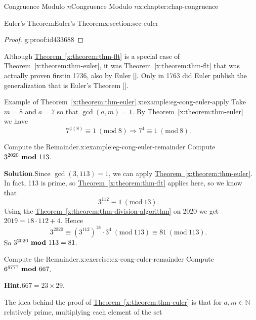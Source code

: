 \documentclass[oneside,10pt,]{book}
\newcommand{\blocktitlefont}{\relax}
\newcommand{\xreffont}{\relax}
\numberwithin{equation}{section}
\newcommand{\Mod}[1]{\ \left(\mathrm{mod}\ #1\right)}
\newcommand{\mmod}[1]{\ \mathrm{\bf mod}\ #1}
\begin{document}
\begin{chapterptx}{Congruence Modulo \(n\)}{}{Congruence Modulo \(n\)}{}{}{x:chapter:chap-congruence}
\begin{sectionptx}{Euler's Theorem}{}{Euler's Theorem}{}{}{x:section:sec-euler}
\begin{proof}{}{g:proof:id433688}
\end{proof}
Although \hyperref[x:theorem:thm-flt]{Theorem~{\xreffont\ref{x:theorem:thm-flt}}} is a special case of \hyperref[x:theorem:thm-euler]{Theorem~{\xreffont\ref{x:theorem:thm-euler}}}, it was \hyperref[x:theorem:thm-flt]{Theorem~{\xreffont\ref{x:theorem:thm-flt}}} that was actually proven first\textemdash{}in 1736, also by Euler \hyperlink{x:biblio:bib-euler-54}{[{\xreffont 1}]}. Only in 1763 did Euler publish the generalization that is Euler's Theorem \hyperlink{x:biblio:bib-euler-271}{[{\xreffont 2}]}.%
\begin{example}{Example of Theorem~{\xreffont\ref*{x:theorem:thm-euler}}.}{x:example:eg-cong-euler-apply}%
Take \(m = 8\) and \(a = 7\) so that \(\gcd(a,m) = 1\). By \hyperref[x:theorem:thm-euler]{Theorem~{\xreffont\ref{x:theorem:thm-euler}}} we have%
\begin{equation*}
7^{\phi(8)} \equiv 1 \Mod{8} \Rightarrow 7^4 \equiv 1 \Mod{8}\text{.}
\end{equation*}
%
\end{example}
\begin{example}{Compute the Remainder.}{x:example:eg-cong-euler-remainder}%
Compute \(3^{2020} \mmod 113\).%
\par\smallskip%
\noindent\textbf{\blocktitlefont Solution}.\hypertarget{g:solution:id235946}{}\quad{}Since \(\gcd(3,113) = 1\), we can apply \hyperref[x:theorem:thm-euler]{Theorem~{\xreffont\ref{x:theorem:thm-euler}}}. In fact, 113 is prime, so \hyperref[x:theorem:thm-flt]{Theorem~{\xreffont\ref{x:theorem:thm-flt}}} applies here, so we know that%
\begin{equation*}
3^{112} \equiv 1 \Mod{13}\text{.}
\end{equation*}
Using the \hyperref[x:theorem:thm-division-algorithm]{Theorem~{\xreffont\ref{x:theorem:thm-division-algorithm}}} on 2020 we get \(2019 = 18\cdot 112 + 4\). Hence%
\begin{equation*}
3^{2020} \equiv (3^{112})^{18} \cdot 3^4 \Mod{113} \equiv 81 \Mod{113}\text{.}
\end{equation*}
So \(3^{2020} \mmod 113 = 81\).%
\end{example}
\begin{inlineexercise}{Compute the Remainder.}{x:exercise:ex-cong-euler-remainder}%
Compute \(6^{6777} \mmod 667\).%
\par\smallskip%
\noindent\textbf{\blocktitlefont Hint}.\hypertarget{g:hint:id234950}{}\quad{}\(667 = 23 \times 29.\)%
\end{inlineexercise}
The idea behind the proof of \hyperref[x:theorem:thm-euler]{Theorem~{\xreffont\ref{x:theorem:thm-euler}}} is that for \(a,m \in \mathbb{N}\) relatively prime, multiplying each element of the set%

\end{sectionptx}
\end{chapterptx}
\end{document}
